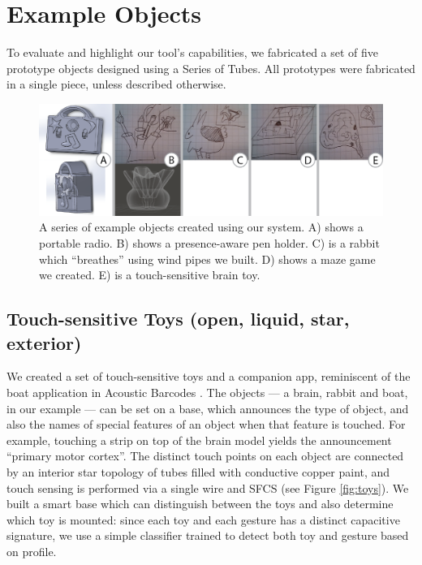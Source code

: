 \section{Example Objects}

To evaluate and highlight our tool's capabilities, we fabricated a set of five prototype objects designed using a Series of Tubes.  All prototypes were fabricated in a single piece, unless described otherwise.

\begin{figure}[h!]
\centering
    \includegraphics[width=7in]{figures/examples.png}
\caption{A series of example objects created using our system.  A) shows a portable radio.  B) shows a presence-aware pen holder.  C) is a rabbit which ``breathes'' using wind pipes we built.  D) shows a maze game we created.  E) is a touch-sensitive brain toy.  }
\label{fig:examples}
\end{figure}

 

\subsection{Touch-sensitive Toys (open, liquid, star, exterior)}


We created a set of touch-sensitive toys and a companion app, reminiscent of the boat application in Acoustic Barcodes \cite{Harrison-acoustic} . The objects --- a brain, rabbit and boat, in our example --- can be set on a base, which announces the type of object, and also the names of special features of an object when that feature is touched. For example, touching a strip on top of the brain model yields the announcement ``primary motor cortex''. The distinct touch points on each object are connected by an interior star topology of tubes filled with conductive copper paint, and touch sensing is performed via a single wire and SFCS (see Figure \ref{fig:toys}).  We built a smart base which can distinguish between the toys and also determine which toy is mounted: since each toy and each gesture has a distinct capacitive signature, we use a simple classifier trained to detect both toy and gesture based on profile.

